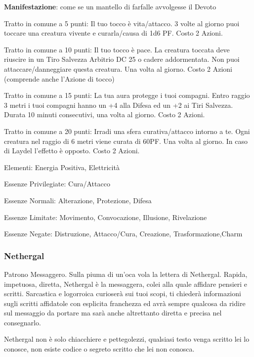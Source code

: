 \documentclass[a4paper,11pt,twoside,openany]{book}
\begin{document}
\textbf{Manifestazione}: come se un mantello di farfalle avvolgesse il Devoto

\bigskip

Tratto in comune a 5 punti: Il tuo tocco è vita/attacco. 3 volte al giorno puoi toccare una creatura vivente e curarla/causa di 1d6 PF. Costo 2 Azioni.

Tratto in comune a 10 punti: Il tuo tocco è pace. La creatura toccata deve riuscire in un Tiro Salvezza Arbitrio DC 25 o cadere addormentata. Non puoi attaccare/danneggiare questa creatura. Una volta al giorno. Costo 2 Azioni (comprende anche l'Azione di tocco)

Tratto in comune a 15 punti: La tua aura protegge i tuoi compagni. Entro raggio 3 metri i tuoi compagni hanno un +4 alla Difesa ed un +2 ai Tiri Salvezza. Durata 10 minuti consecutivi, una volta al giorno. Costo 2 Azioni.

Tratto in comune a 20 punti: Irradi una sfera curativa/attacco intorno a te. Ogni creatura nel raggio di 6 metri viene curata di 60PF. Una volta al giorno. In caso di Laydel l'effetto è opposto. Costo 2 Azioni.

\bigskip

Elementi: Energia Positiva, Elettricità

\bigskip

Essenze Privilegiate: Cura/Attacco

Essenze Normali: Alterazione, Protezione, Difesa

Essenze Limitate: Movimento, Convocazione, Illusione, Rivelazione

Essenze Negate: Distruzione, Attacco/Cura, Creazione, Trasformazione,Charm

\subsubsection{Nethergal}

\label{nethergal}

Patrono Messaggero. Sulla piuma di un'oca vola la lettera di Nethergal. Rapida, impetuosa, diretta, Nethergal è la messaggera, colei alla quale affidare pensieri e scritti. Sarcastica e logorroica curioserà sui tuoi scopi, ti chiederà informazioni sugli scritti affidatole con esplicita franchezza ed avrà sempre qualcosa da ridire sul messaggio da portare ma sarà anche altrettanto diretta e precisa nel consegnarlo.

Nethergal non è solo chiacchiere e pettegolezzi, qualsiasi testo venga scritto lei lo conosce, non esiste codice o segreto scritto che lei non conosca.
\end{document}
